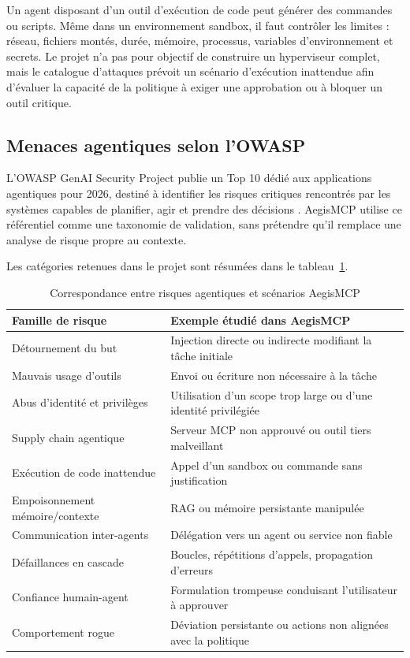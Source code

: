 Un agent disposant d'un outil d'exécution de code peut générer des commandes ou scripts. Même dans un environnement sandbox, il faut contrôler les limites : réseau, fichiers montés, durée, mémoire, processus, variables d'environnement et secrets. Le projet n'a pas pour objectif de construire un hyperviseur complet, mais le catalogue d'attaques prévoit un scénario d'exécution inattendue afin d'évaluer la capacité de la politique à exiger une approbation ou à bloquer un outil critique.

\subsection{Menaces agentiques selon l'OWASP}

L'OWASP GenAI Security Project publie un Top 10 dédié aux applications agentiques pour 2026, destiné à identifier les risques critiques rencontrés par les systèmes capables de planifier, agir et prendre des décisions \cite{owaspagentic2026}. AegisMCP utilise ce référentiel comme une taxonomie de validation, sans prétendre qu'il remplace une analyse de risque propre au contexte.

Les catégories retenues dans le projet sont résumées dans le tableau~\ref{tab:owasp-agentic}.

\begin{table}[H]
\centering
\caption{Correspondance entre risques agentiques et scénarios AegisMCP}
\label{tab:owasp-agentic}
\begin{tabularx}{\textwidth}{p{3.8cm} X}
\toprule
\textbf{Famille de risque} & \textbf{Exemple étudié dans AegisMCP} \\
\midrule
Détournement du but & Injection directe ou indirecte modifiant la tâche initiale \\
Mauvais usage d'outils & Envoi ou écriture non nécessaire à la tâche \\
Abus d'identité et privilèges & Utilisation d'un scope trop large ou d'une identité privilégiée \\
Supply chain agentique & Serveur MCP non approuvé ou outil tiers malveillant \\
Exécution de code inattendue & Appel d'un sandbox ou commande sans justification \\
Empoisonnement mémoire/contexte & RAG ou mémoire persistante manipulée \\
Communication inter-agents & Délégation vers un agent ou service non fiable \\
Défaillances en cascade & Boucles, répétitions d'appels, propagation d'erreurs \\
Confiance humain-agent & Formulation trompeuse conduisant l'utilisateur à approuver \\
Comportement rogue & Déviation persistante ou actions non alignées avec la politique \\
\bottomrule
\end{tabularx}
\end{table}

